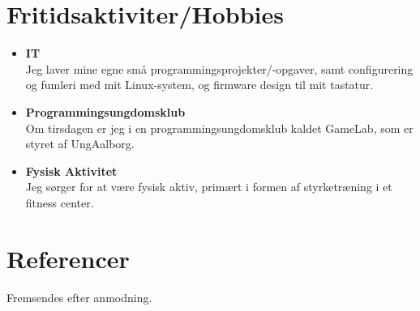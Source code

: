 \documentclass{article}
\begin{document}
    \section*{Fritidsaktiviter/Hobbies}
    \begin{itemize}\setlength\itemsep{0.5em}
        \item[] \textbf{IT}\\
            Jeg laver mine egne små programmingsprojekter/-opgaver, samt configurering og fumleri
            med mit Linux-system, og firmware design til mit tastatur.
        \item[] \textbf{Programmingsungdomsklub}\\
            Om tirsdagen er jeg i en programmingsungdomsklub kaldet GameLab, som er styret af
            UngAalborg.
        \item[] \textbf{Fysisk Aktivitet}\\
            Jeg sørger for at være fysisk aktiv, primært i formen af styrketræning i et fitness center.
    \end{itemize}

    \section*{Referencer}
    Fremsendes efter anmodning.
\end{document}
